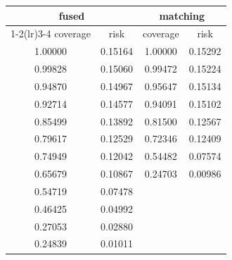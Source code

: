 \begin{tabular}{cccc}
\toprule
\multicolumn{2}{c}{fused} & \multicolumn{2}{c}{matching} \\
\cmidrule(lr){1-2}\cmidrule(lr){3-4}
coverage & risk & coverage & risk \\
\midrule
1.00000 & 0.15164 & 1.00000 & 0.15292 \\
0.99828 & 0.15060 & 0.99472 & 0.15224 \\
0.94870 & 0.14967 & 0.95647 & 0.15134 \\
0.92714 & 0.14577 & 0.94091 & 0.15102 \\
0.85499 & 0.13892 & 0.81500 & 0.12567 \\
0.79617 & 0.12529 & 0.72346 & 0.12409 \\
0.74949 & 0.12042 & 0.54482 & 0.07574 \\
0.65679 & 0.10867 & 0.24703 & 0.00986 \\
0.54719 & 0.07478 &         &         \\
0.46425 & 0.04992 &         &         \\
0.27053 & 0.02880 &         &         \\
0.24839 & 0.01011 &         &         \\
\bottomrule
\end{tabular}
